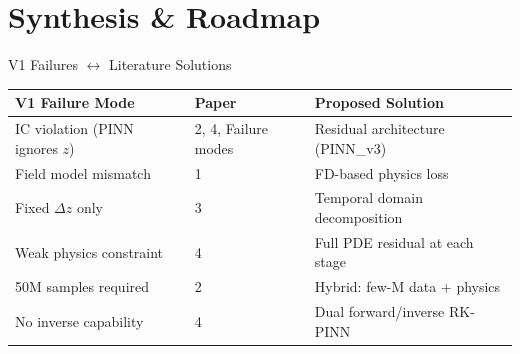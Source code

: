 \documentclass[aspectratio=169, 11pt]{beamer}
\begin{document}
\section{Synthesis \& Roadmap}

\begin{frame}{V1 Failures $\leftrightarrow$ Literature Solutions}
  \centering
  \begin{tabular}{p{4.5cm}lp{5cm}}
    \toprule
    \textbf{V1 Failure Mode} & \textbf{Paper} & \textbf{Proposed Solution} \\
    \midrule
    IC violation (PINN ignores $z$) & 2, 4, Failure modes & Residual architecture (PINN\_v3) \\[3pt]
    Field model mismatch & 1 & FD-based physics loss \\[3pt]
    Fixed $\Delta z$ only & 3 & Temporal domain decomposition \\[3pt]
    Weak physics constraint & 4 & Full PDE residual at each stage \\[3pt]
    50M samples required & 2 & Hybrid: few-M data + physics \\[3pt]
    No inverse capability & 4 & Dual forward/inverse RK-PINN \\
    \bottomrule
  \end{tabular}
\end{frame}
\end{document}
